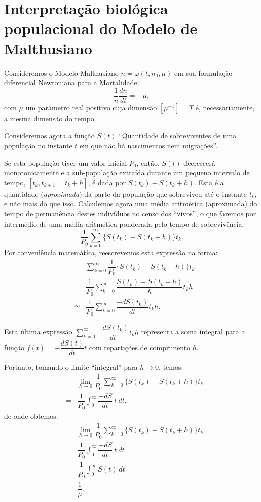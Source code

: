 \section{Interpretação biológica populacional do Modelo de Malthusiano}

    Consideremos o Modelo Malthusiano \(n = \varphi(t, n_0, \mu)\) em sua formulação diferencial Newtoniana para a Mortalidade:
    \[\dfrac{1}{n} \dfrac{dn}{dt} = -\mu,\]
    com \(\mu\) um parâmetro real positivo cuja dimensão \([\mu^{-1}] = T\) é, necessariamente, a mesma dimensão do tempo.
    
    Consideremos agora a função \(S(t)\) ``Quantidade de sobreviventes de uma população no instante \(t\) em que não há nascimentos nem migrações''.

    Se esta população tiver um valor inicial \(P_0\), então, \(S(t)\) decrescerá monotonicamente e a sub-população extraída durante um pequeno intervalo de tempo, \([t_{k},t_{k+1} = t_{k}+h]\), é dada por \(S(t_k) - S(t_{k}+h)\). Esta é a quantidade (\textit{aproximada}) da parte da população que sobreviveu até o instante \(t_{k}\), e não mais do que isso. Calculemos agora uma média aritmética (aproximada) do tempo de permanência destes indivíduos no censo dos ``vivos'', o que faremos por intermédio de uma média aritmética ponderada pelo tempo de sobrevivência:
    \[\dfrac{1}{P_0}\displaystyle\sum_{k=0}^{\infty} \{S(t_k)-S(t_k+h)\} t_k.\]
    Por conveniência matemática, reescrevemos esta expressão na forma:
    \[\begin{array}{rcl}
    & & \displaystyle\sum_{k=0}^{\infty}\dfrac{1}{P_0} \{S(t_k)-S(t_k+h)\} t_k \\
    &=& \dfrac{1}{P_0}\sum_{k=0}^{\infty} \dfrac{S(t_k)-S(t_k+h)}{h} t_k h\\
    &\simeq& \dfrac{1}{P_0}\sum_{k=0}^{\infty} \dfrac{-dS(t_k)}{dt} t_k h.
    \end{array}\]

    Esta última expressão \(\displaystyle\sum_{k=0}^{\infty} \dfrac{-dS(t_k)}{dt} t_k h\) representa a soma integral para a função \(f(t) = -\dfrac{dS(t)}{dt} t\) com repartições de comprimento \(h\).

    Portanto, tomando o limite ``integral'' para \(h \to 0\), temos:
    \[\begin{array}{rcl}
    & & \displaystyle\lim_{h \to 0} \dfrac{1}{P_0} \sum_{k=0}^{\infty} \{S(t_k)-S(t_k+h)\} t_k \\[0.4cm]
    &=& \dfrac{1}{P_0} \int_{0}^{\infty} \dfrac{-dS}{dt}\ t\ dt,
    \end{array}\]
    de onde obtemos:
    \[\begin{array}{rcl}
    & & \displaystyle\lim_{h \to 0} \dfrac{1}{P_0} \sum_{k=0}^{\infty} \{S(t_k)-S(t_k+h)\} t_k \\[0.4cm]
    &=& \dfrac{1}{P_0} \int_{0}^{\infty} \dfrac{-dS}{dt}\ t\ dt \\[0.4cm]
    &=& \dfrac{1}{P_0} \int_{0}^{\infty} S(t)\ dt \\[0.4cm]
    &=& \dfrac{1}{\mu}.
    \end{array}\]



